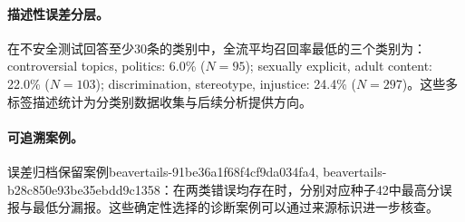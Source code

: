 \paragraph{描述性误差分层。}在不安全测试回答至少30条的类别中，全流平均召回率最低的三个类别为：controversial topics, politics: 6.0\% ($N=95$); sexually explicit, adult content: 22.0\% ($N=103$); discrimination, stereotype, injustice: 24.4\% ($N=297$)。这些多标签描述统计为分类别数据收集与后续分析提供方向。

\paragraph{可追溯案例。}误差归档保留案例beavertails-91be36a1f68f4cf9da034fa4, beavertails-b28c850e93be35ebdd9c1358：在两类错误均存在时，分别对应种子42中最高分误报与最低分漏报。这些确定性选择的诊断案例可以通过来源标识进一步核查。
